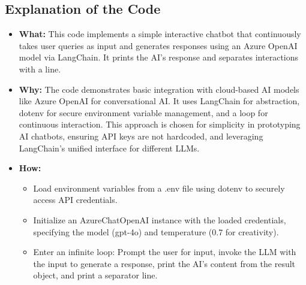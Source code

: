 \documentclass[11pt, a4paper]{article}
\begin{document}
\subsection{Explanation of the Code}
\begin{itemize}
    \item \textbf{What:} This code implements a simple interactive chatbot that continuously takes user queries as input and generates responses using an Azure OpenAI model via LangChain. It prints the AI's response and separates interactions with a line.
    \item \textbf{Why:} The code demonstrates basic integration with cloud-based AI models like Azure OpenAI for conversational AI. It uses LangChain for abstraction, dotenv for secure environment variable management, and a loop for continuous interaction. This approach is chosen for simplicity in prototyping AI chatbots, ensuring API keys are not hardcoded, and leveraging LangChain's unified interface for different LLMs.
    \item \textbf{How:}
    \begin{itemize}
        \item Load environment variables from a .env file using dotenv to securely access API credentials.
        \item Initialize an AzureChatOpenAI instance with the loaded credentials, specifying the model (gpt-4o) and temperature (0.7 for creativity).
        \item Enter an infinite loop: Prompt the user for input, invoke the LLM with the input to generate a response, print the AI's content from the result object, and print a separator line.
    \end{itemize}
\end{itemize}
\end{document}
